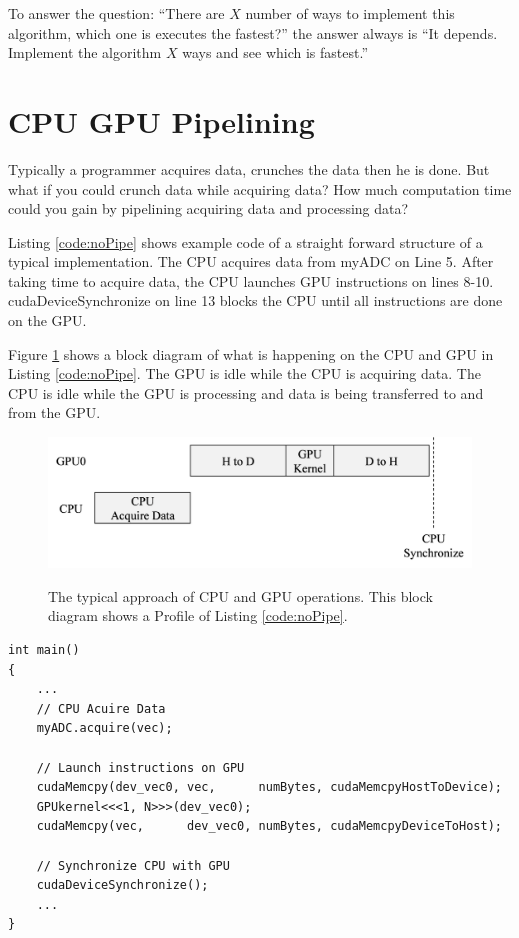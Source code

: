 To answer the question: ``There are $X$ number of ways to implement this algorithm, which one is executes the fastest?'' the answer always is ``It depends. Implement the algorithm $X$ ways and see which is fastest.''

\section{CPU GPU Pipelining}
Typically a programmer acquires data, crunches the data then he is done.
But what if you could crunch data while acquiring data? 
How much computation time could you gain by pipelining acquiring data and processing data?

Listing \ref{code:noPipe} shows example code of a straight forward structure of a typical implementation.
The CPU acquires data from myADC on Line 5.
After taking time to acquire data, the CPU launches GPU instructions on lines 8-10.
cudaDeviceSynchronize on line 13 blocks the CPU until all instructions are done on the GPU.

Figure \ref{fig:concurrentCPU_nonBlocking} shows a block diagram of what is happening on the CPU and GPU in Listing \ref{code:noPipe}.
The GPU is idle while the CPU is acquiring data.
The CPU is idle while the GPU is processing and data is being transferred to and from the GPU.
\begin{figure}
	\caption{The typical approach of CPU and GPU operations. This block diagram shows a Profile of Listing \ref{code:noPipe}.}
	\centering\includegraphics[width=8.77in/100*55]{figures/gpu_intro/concurrentCPU_nonBlocking.pdf}
	\label{fig:concurrentCPU_nonBlocking}
\end{figure}
\singlespacing
\begin{lstlisting}[style=myCUDAstyle,caption={Example code Simple example of the CPU acquiring data from myADC, copying from host to device, processing data on the device then copying from device to host. No processing occurs on device while CPU is acquiring data.},label={code:noPipe}]
int main()
{
	...
	// CPU Acuire Data
	myADC.acquire(vec);
	
	// Launch instructions on GPU 
	cudaMemcpy(dev_vec0, vec,      numBytes, cudaMemcpyHostToDevice);
	GPUkernel<<<1, N>>>(dev_vec0);
	cudaMemcpy(vec,      dev_vec0, numBytes, cudaMemcpyDeviceToHost);
	
	// Synchronize CPU with GPU
	cudaDeviceSynchronize();
	...
}
\end{lstlisting}
\doublespacing

